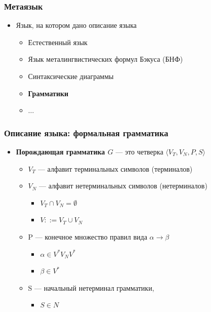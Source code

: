 \documentclass{beamer}
\begin{document}
\begin{frame}[fragile]
  \transwipe[direction=90]
  \frametitle{Метаязык}
  \begin{itemize}
    \item Язык, на котором дано описание языка
    \begin{itemize}
      \item Естественный язык
      \item Язык металингвистических формул Бэкуса (БНФ)
      \item Синтаксические диаграммы
      \item \textbf{Грамматики}
      \item $\dots$
    \end{itemize}
  \end{itemize}
\end{frame}

\begin{frame}[fragile]
  \transwipe[direction=90]
  \frametitle{Описание языка: формальная грамматика}
  \begin{itemize}
    \item \textbf{Порождающая грамматика $G$} --- это четверка $\langle V_T, V_N, P, S \rangle$

    \begin{itemize}
      \item $V_T$ --- алфавит терминальных  символов (терминалов) 
      \item $V_N$ --- алфавит нетерминальных  символов (нетерминалов)
      \begin{itemize} 
        \item $V_T \cap V_N = \emptyset$ 
        \item $V ::= V_T \cup V_N$
      \end{itemize}
      \item P --- конечное множество правил вида $\alpha \rightarrow \beta$
      \begin{itemize}
        \item $\alpha \in V^* V_N V^*$
        \item $\beta \in V^*$
      \end{itemize}  
      \item S --- начальный нетерминал грамматики,\begin{itemize}
        \item $S  \in N$
      \end{itemize}
    \end{itemize}
  \end{itemize}
\end{frame}
\end{document}
